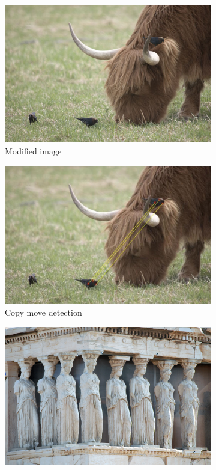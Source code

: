 \documentclass[12pt]{article}
\begin{document}
\begin{figure}
\centering
\begin{subfigure}{.5\textwidth}
  \centering
  \includegraphics[width=.8\linewidth]{./gfx/cattle.png}
  \caption{Modified image}
  \label{fig:sub1}
\end{subfigure}%
\begin{subfigure}{.5\textwidth}
  \centering
  \includegraphics[width=.8\linewidth]{./gfx/cattle_mod.jpg}
  \caption{Copy move detection}
  \label{fig:sub2}
\end{subfigure}
\begin{subfigure}{.5\textwidth}
  \centering
  \includegraphics[width=.8\linewidth]{./gfx/kore.png}

\end{subfigure}
\end{figure}
\end{document}
